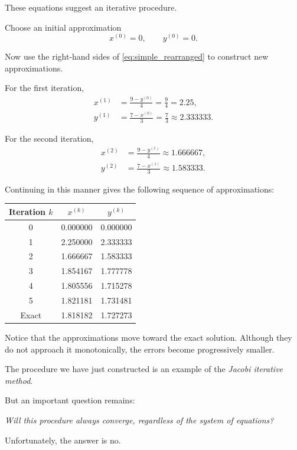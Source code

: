 \documentclass[11pt,a4paper]{article}
\theoremstyle{definition}
\theoremstyle{remark}
\begin{document}
These equations suggest an iterative procedure.

Choose an initial approximation
\[
    x^{(0)}=0,
    \qquad
    y^{(0)}=0.
\]

Now use the right-hand sides of
\eqref{eq:simple_rearranged} to construct new
approximations.

For the first iteration,
\[
\begin{aligned}
    x^{(1)}
    &=\frac{9-y^{(0)}}{4}
      =\frac94=2.25,\\
    y^{(1)}
    &=\frac{7-x^{(0)}}{3}
      =\frac73\approx2.333333.
\end{aligned}
\]

For the second iteration,
\[
\begin{aligned}
    x^{(2)}
    &=\frac{9-y^{(1)}}4
      \approx1.666667,\\
    y^{(2)}
    &=\frac{7-x^{(1)}}3
      \approx1.583333.
\end{aligned}
\]

Continuing in this manner gives the following
sequence of approximations:

\begin{center}
\begin{tabular}{ccc}
\toprule
Iteration $k$ & $x^{(k)}$ & $y^{(k)}$\\
\midrule
0 & 0.000000 & 0.000000\\
1 & 2.250000 & 2.333333\\
2 & 1.666667 & 1.583333\\
3 & 1.854167 & 1.777778\\
4 & 1.805556 & 1.715278\\
5 & 1.821181 & 1.731481\\
\midrule
Exact & 1.818182 & 1.727273\\
\bottomrule
\end{tabular}
\end{center}

Notice that the approximations move toward the
exact solution. Although they do not approach it
monotonically, the errors become progressively smaller.

The procedure we have just constructed is an example
of the \emph{Jacobi iterative method}.

But an important question remains:

\emph{Will this procedure always converge, regardless
of the system of equations?}

Unfortunately, the answer is no.
\end{document}
